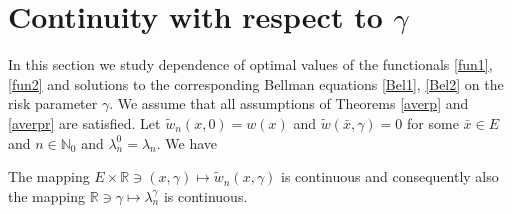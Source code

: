 \documentclass[10pt,english]{extarticle}
\begin{document}
\section{Continuity with respect to $\gamma$}
In this section we study dependence of optimal values of the functionals \eqref{fun1}, \eqref{fun2} and solutions to the corresponding Bellman equations \eqref{Bel1}, \eqref{Bel2} on the risk parameter $\gamma$.   We assume that all assumptions of Theorems \ref{averp}   and \ref{averpr} are satisfied. Let  $\tilde{w}_n(x,0)=w(x)$ and $\tilde{w}(\bar{x},\gamma)=0$ for some $\bar{x}\in E$ and $n\in \mathbb{N}_0$ and $\lambda_n^0=\lambda_n$. We have
\begin{theorem} The mapping $E\times \mathbb{R}\ni (x,\gamma) \mapsto \tilde{w}_n(x,\gamma)$ is continuous and consequently  also the mapping $\mathbb{R} \ni \gamma \mapsto \lambda_n^\gamma$ is continuous.
\end{theorem}
\end{document}
